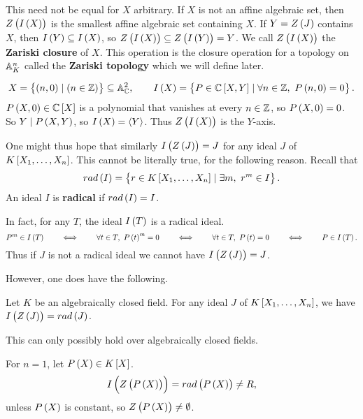 This need not be equal for $ X $ arbitrary. If $ X $ is not an affine algebraic set, then $ Z\br{I\br{X}} $ is the smallest affine algebraic set containing $ X $. If $ Y = Z\br{J} $ contains $ X $, then $ I\br{Y} \subseteq I\br{X} $, so $ Z\br{I\br{X}} \subseteq Z\br{I\br{Y}} = Y $. We call $ Z\br{I\br{X}} $ the \textbf{Zariski closure} of $ X $. This operation is the closure operation for a topology on $ \mathbb{A}_K^n $ called the \textbf{Zariski topology} which we will define later.

\begin{example*}
$$ X = \cbr{\br{n, 0} \mid \br{n \in \Z}} \subseteq \A_\C^2, \qquad I\br{X} = \cbr{P \in \C\sbr{X, Y} \mid \forall n \in \Z, \ P\br{n, 0} = 0}. $$
$ P\br{X, 0} \in \C\sbr{X} $ is a polynomial that vanishes at every $ n \in \mathbb{Z} $, so $ P\br{X, 0} = 0 $. So $ Y \mid P\br{X, Y} $, so $ I\br{X} = \abr{Y} $. Thus $ Z\br{I\br{X}} $ is the $ Y $-axis.
\end{example*}

\pagebreak

One might thus hope that similarly $ I\br{Z\br{J}} = J $ for any ideal $ J $ of $ K\sbr{X_1, \dots, X_n} $. This cannot be literally true, for the following reason. Recall that
$$ rad\br{I} = \cbr{r \in K\sbr{X_1, \dots, X_n} \mid \exists m, \ r^m \in I}. $$
An ideal $ I $ is \textbf{radical} if $ rad\br{I} = I $.

\begin{note*}
In fact, for any $ T $, the ideal $ I\br{T} $ is a radical ideal.
$$ P^m \in I\br{T} \qquad \iff \qquad \forall t \in T, \ P\br{t}^m = 0 \qquad \iff \qquad \forall t \in T, \ P\br{t} = 0 \qquad \iff \qquad P \in I\br{T}. $$
Thus if $ J $ is not a radical ideal we cannot have $ I\br{Z\br{J}} = J $.
\end{note*}

However, one does have the following.

\begin{theorem}
\label{thm:13.2.5}
Let $ K $ be an algebraically closed field. For any ideal $ J $ of $ K\sbr{X_1, \dots, X_n} $, we have $ I\br{Z\br{J}} = rad\br{J} $.
\end{theorem}

\begin{note*}
This can only possibly hold over algebraically closed fields.
\end{note*}

\begin{example*}
For $ n = 1 $, let $ P\br{X} \in K\sbr{X} $.
$$ I\br{Z\br{P\br{X}}} = rad\br{P\br{X}} \ne R, $$
unless $ P\br{X} $ is constant, so $ Z\br{P\br{X}} \ne \emptyset $.
\end{example*}

